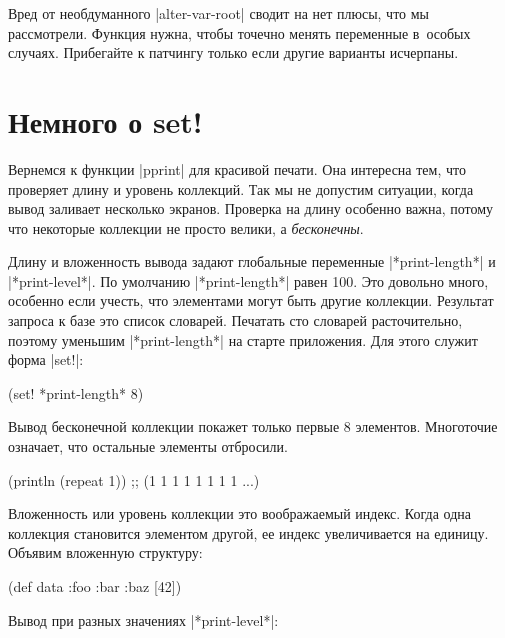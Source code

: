 Вред от необдуманного \spverb|alter-var-root| сводит на нет плюсы, что мы
рассмотрели. Функция нужна, чтобы точечно менять переменные в~особых
случаях. Прибегайте к патчингу только если другие варианты исчерпаны.

\section{Немного о set!}

Вернемся к функции \spverb|pprint| для красивой печати. Она интересна тем, что
проверяет длину и уровень коллекций. Так мы не допустим ситуации, когда вывод
заливает несколько экранов. Проверка на длину особенно важна, потому что
некоторые коллекции не просто велики, а \emph{бесконечны}.

Длину и вложенность вывода задают глобальные переменные \spverb|*print-length*|
и \spverb|*print-level*|. По умолчанию \spverb|*print-length*| равен 100. Это
довольно много, особенно если учесть, что элементами могут быть другие
коллекции. Результат запроса к базе это список словарей. Печатать сто
словарей расточительно, поэтому уменьшим \spverb|*print-length*| на старте
приложения. Для этого служит форма \spverb|set!|:

\begin{english}
  \begin{clojure}
(set! *print-length* 8)
  \end{clojure}
\end{english}

\noindent
Вывод бесконечной коллекции покажет только первые 8 элементов. Многоточие
означает, что остальные элементы отбросили.

\begin{english}
  \begin{clojure}
(println (repeat 1))
;; (1 1 1 1 1 1 1 1 ...)
  \end{clojure}
\end{english}

Вложенность или уровень коллекции это воображаемый индекс. Когда одна коллекция
становится элементом другой, ее индекс увеличивается на единицу. Объявим
вложенную структуру:

\begin{english}
  \begin{clojure}
(def data {:foo {:bar {:baz [42]}}})
  \end{clojure}
\end{english}

\noindent
Вывод при разных значениях \spverb|*print-level*|:

